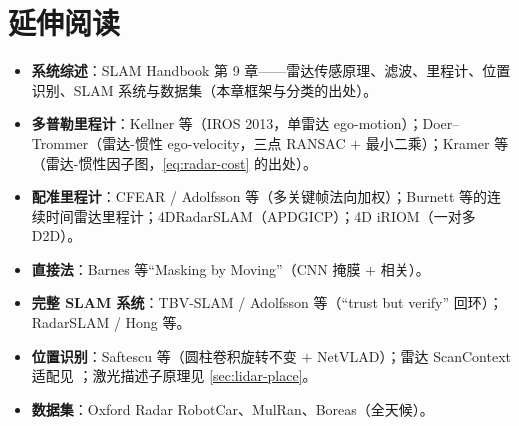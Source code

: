 \section*{延伸阅读}
\begin{itemize}
  \item \textbf{系统综述}：SLAM Handbook\cite{carlone2026handbook} 第 9 章——雷达传感原理、滤波、里程计、位置识别、SLAM 系统与数据集（本章框架与分类的出处）。
  \item \textbf{多普勒里程计}：Kellner 等\cite{kellner2013doppler}（IROS 2013，单雷达 ego-motion）；Doer--Trommer\cite{doer2020radarinertial}（雷达-惯性 ego-velocity，三点 RANSAC $+$ 最小二乘）；Kramer 等\cite{kramer2021radarinertial}（雷达-惯性因子图，\cref{eq:radar-cost} 的出处）。
  \item \textbf{配准里程计}：CFEAR / Adolfsson 等\cite{adolfsson2021cfear}（多关键帧法向加权）；Burnett 等的连续时间雷达里程计\cite{burnett2021radarct}；4DRadarSLAM\cite{zhang20234dradarslam}（APDGICP）；4D iRIOM\cite{zhang20234diriom}（一对多 D2D）。
  \item \textbf{直接法}：Barnes 等“Masking by Moving”\cite{barnes2020masking}（CNN 掩膜 $+$ 相关）。
  \item \textbf{完整 SLAM 系统}：TBV-SLAM / Adolfsson 等\cite{adolfsson2023tbv}（“trust but verify” 回环）；RadarSLAM / Hong 等\cite{hong2022radarslam}。
  \item \textbf{位置识别}：Saftescu 等\cite{saftescu2020kidnapped}（圆柱卷积旋转不变 $+$ NetVLAD）；雷达 ScanContext 适配见 \cite{adolfsson2023tbv}；激光描述子原理见 \cref{sec:lidar-place}。
  \item \textbf{数据集}：Oxford Radar RobotCar\cite{barnes2020oxford}、MulRan\cite{kim2020mulran}、Boreas\cite{burnett2023boreas}（全天候）。
\end{itemize}


